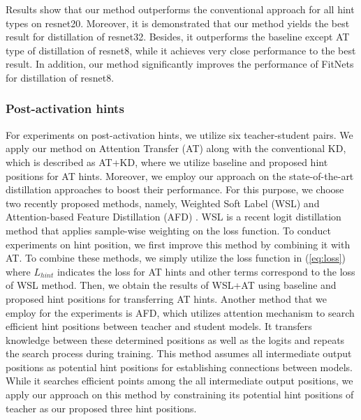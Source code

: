 \documentclass[final,3p,times]{elsarticle}
\begin{document}
Results show that our method outperforms the conventional approach for all hint types on resnet20. Moreover, it is demonstrated that our method yields the best result for distillation of resnet32. 
Besides, it outperforms the baseline except AT type of distillation of resnet8, while it achieves very close performance to the best result. In addition, our method significantly improves the performance of FitNets for distillation of resnet8. 

\subsubsection{Post-activation hints}

For experiments on post-activation hints, we utilize six teacher-student pairs. We apply our method on Attention Transfer (AT) along with the conventional KD, which is described as AT+KD, where we utilize baseline and proposed hint positions for AT hints. Moreover, we employ our approach on the state-of-the-art distillation approaches to boost their performance. For this purpose, we choose two recently proposed methods, namely, Weighted Soft Label (WSL) \citep{zhou2021rethinking} and Attention-based Feature Distillation (AFD) \citep{ji2021show}. WSL is a recent logit distillation method that applies sample-wise weighting on the loss function. To conduct experiments on hint position, we first improve this method by combining it with AT. 
To combine these methods, we simply utilize the loss function in (\ref{eq:loss}) where $L_{hint}$ indicates the loss for AT hints and other terms correspond to the loss of WSL method.
Then, we obtain the results of WSL+AT using baseline and proposed hint positions for transferring AT hints.
Another method that we employ for the experiments is AFD, which utilizes attention mechanism to search efficient hint positions between teacher and student models. It transfers knowledge between these determined positions as well as the logits and repeats the search process during training. This method assumes all intermediate output positions as potential hint positions for establishing connections between models. While it searches efficient points among the all intermediate output positions, we apply our approach on this method by constraining its potential hint positions of teacher as our proposed three hint positions. 
\end{document}
